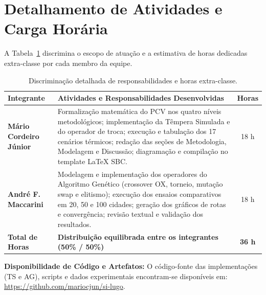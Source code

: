 \documentclass[11pt]{article}
\begin{document}
\section{Detalhamento de Atividades e Carga Horária} \label{ap:papeis-detalhes}

A Tabela~\ref{tab:papeis-detalhada} discrimina o escopo de atuação e a estimativa de horas dedicadas extra-classe por cada membro da equipe.

\begin{table}[H]
\centering
\caption{Discriminação detalhada de responsabilidades e horas extra-classe.}
\label{tab:papeis-detalhada}
\begin{tabular}{p{4.2cm}p{8.5cm}c}
\toprule
\textbf{Integrante} & \textbf{Atividades e Responsabilidades Desenvolvidas} & \textbf{Horas} \\
\midrule
\textbf{Mário Cordeiro Júnior} & Formalização matemática do PCV nos quatro níveis metodológicos; implementação da Têmpera Simulada e do operador de troca; execução e tabulação dos 17 cenários térmicos; redação das seções de Metodologia, Modelagem e Discussão; diagramação e compilação no template LaTeX SBC. & 18 h \\[2mm]
\textbf{André F. Maccarini} & Modelagem e implementação dos operadores do Algoritmo Genético (crossover OX, torneio, mutação swap e elitismo); execução dos ensaios comparativos em 20, 50 e 100 cidades; geração dos gráficos de rotas e convergência; revisão textual e validação dos resultados. & 18 h \\
\midrule
\textbf{Total de Horas} & \textbf{Distribuição equilibrada entre os integrantes (50\% / 50\%)} & \textbf{36 h} \\
\bottomrule
\end{tabular}
\end{table}

\vspace{2mm}
\noindent\textbf{Disponibilidade de Código e Artefatos:} O código-fonte das implementações (TS e AG), scripts e dados experimentais encontram-se disponíveis em: \url{https://github.com/mariocjun/si-lugo}.
\end{document}
